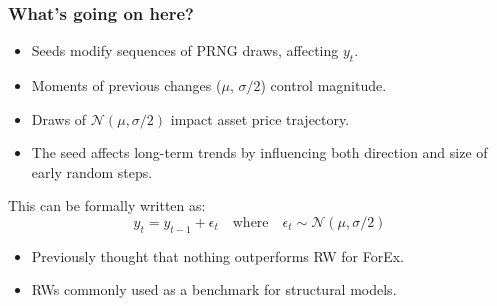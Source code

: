 \documentclass[12pt]{beamer}
\begin{document}
\begin{frame}
\frametitle{What's going on here?}
	\begin{itemize}
	    \item Seeds modify sequences of PRNG draws, affecting $y_t$.\vspace{.065in}
	    \item Moments of previous changes ($\mu$, $\sigma/2$) control magnitude.\vspace{.065in}
	    \item Draws of $\mathcal{N}(\mu, \sigma/2)$ impact asset price trajectory.\vspace{.065in}
	    \item The seed affects long-term trends by influencing both direction and size of early random steps.\vspace{.065in}
	\end{itemize}
This can be formally written as:
\begin{equation}
y_t = y_{t-1} + \epsilon_t \quad \text{where} \quad \epsilon_t \sim \mathcal{N}(\mu, \sigma/2)
\end{equation}

\begin{itemize}
	\item Previously thought that nothing outperforms RW for ForEx.\vspace{.065in}
	\item RWs commonly used as a benchmark for structural models.
\end{itemize}
\end{frame}
\end{document}
